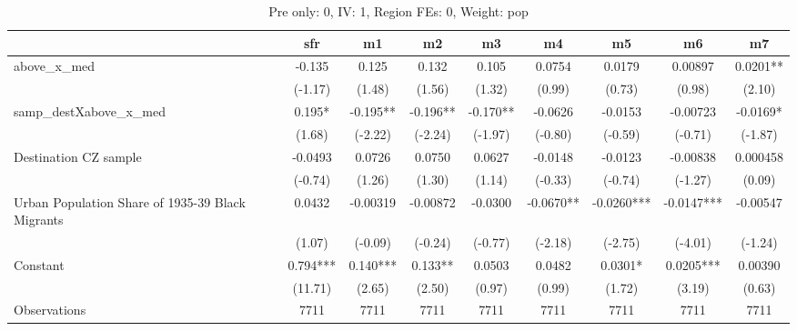 \begin{table}[htbp]\centering
\def\sym#1{\ifmmode^{#1}\else\(^{#1}\)\fi}
\caption{Pre only: 0, IV: 1, Region FEs: 0, Weight: pop}
\begin{tabular}{l*{8}{c}}
\toprule
                    &\multicolumn{1}{c}{sfr}&\multicolumn{1}{c}{m1}&\multicolumn{1}{c}{m2}&\multicolumn{1}{c}{m3}&\multicolumn{1}{c}{m4}&\multicolumn{1}{c}{m5}&\multicolumn{1}{c}{m6}&\multicolumn{1}{c}{m7}\\
\midrule
above\_x\_med         &      -0.135   &       0.125   &       0.132   &       0.105   &      0.0754   &      0.0179   &     0.00897   &      0.0201** \\
                    &     (-1.17)   &      (1.48)   &      (1.56)   &      (1.32)   &      (0.99)   &      (0.73)   &      (0.98)   &      (2.10)   \\
\addlinespace
samp\_destXabove\_x\_med&       0.195*  &      -0.195** &      -0.196** &      -0.170** &     -0.0626   &     -0.0153   &    -0.00723   &     -0.0169*  \\
                    &      (1.68)   &     (-2.22)   &     (-2.24)   &     (-1.97)   &     (-0.80)   &     (-0.59)   &     (-0.71)   &     (-1.87)   \\
\addlinespace
Destination CZ sample&     -0.0493   &      0.0726   &      0.0750   &      0.0627   &     -0.0148   &     -0.0123   &    -0.00838   &    0.000458   \\
                    &     (-0.74)   &      (1.26)   &      (1.30)   &      (1.14)   &     (-0.33)   &     (-0.74)   &     (-1.27)   &      (0.09)   \\
\addlinespace
Urban Population Share of 1935-39 Black Migrants&      0.0432   &    -0.00319   &    -0.00872   &     -0.0300   &     -0.0670** &     -0.0260***&     -0.0147***&    -0.00547   \\
                    &      (1.07)   &     (-0.09)   &     (-0.24)   &     (-0.77)   &     (-2.18)   &     (-2.75)   &     (-4.01)   &     (-1.24)   \\
\addlinespace
Constant            &       0.794***&       0.140***&       0.133** &      0.0503   &      0.0482   &      0.0301*  &      0.0205***&     0.00390   \\
                    &     (11.71)   &      (2.65)   &      (2.50)   &      (0.97)   &      (0.99)   &      (1.72)   &      (3.19)   &      (0.63)   \\
\midrule
Observations        &        7711   &        7711   &        7711   &        7711   &        7711   &        7711   &        7711   &        7711   \\

\end{tabular}
\end{table}
